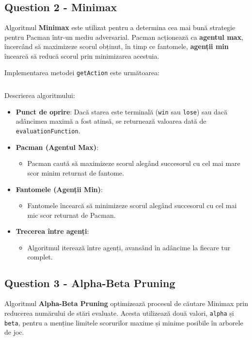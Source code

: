 \subsection{Question 2 - Minimax}
\par Algoritmul \textbf{Minimax} este utilizat pentru a determina cea mai bună strategie pentru Pacman într-un mediu adversarial. Pacman acționează ca \textbf{agentul max}, încercând să maximizeze scorul obținut, în timp ce fantomele, \textbf{agenții min} încearcă să reducă scorul prin minimizarea acestuia.

\par Implementarea metodei \texttt{getAction} este următoarea:
\inputminted[linenos]{python}{code/minimax.py}

\par Descrierea algoritmului:
\begin{itemize}
	\item \textbf{Punct de oprire}: Dacă starea este terminală (\texttt{win} sau \texttt{lose}) sau dacă adâncimea maximă a fost atinsă, se returnează valoarea dată de \texttt{evaluationFunction}.
	\item \textbf{Pacman (Agentul Max)}:
	\begin{itemize}
		\item Pacman caută să maximizeze scorul alegând succesorul cu cel mai mare scor minim returnat de fantome.
	\end{itemize}
	\item \textbf{Fantomele (Agenții Min)}:
	\begin{itemize}
		\item Fantomele încearcă să minimizeze scorul alegând succesorul cu cel mai mic scor returnat de Pacman.
	\end{itemize}
	\item \textbf{Trecerea între agenți}: 
	\begin{itemize}
		\item Algoritmul iterează între agenți, avansând în adâncime la fiecare tur complet.
	\end{itemize}
\end{itemize}

\subsection{Question 3 - Alpha-Beta Pruning}
\par Algoritmul \textbf{Alpha-Beta Pruning} optimizează procesul de căutare Minimax prin reducerea numărului de stări evaluate. Acesta utilizează două valori, \texttt{alpha} și \texttt{beta}, pentru a menține limitele scorurilor maxime și minime posibile în arborele de joc.

